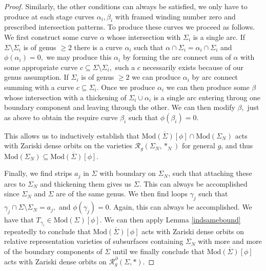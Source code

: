 \documentclass[10pt,a4paper]{amsart}
\newcommand{\Mod}{\textrm{Mod}}
\newcommand{\Rc}{\mathcal{R}}
\begin{document}
\begin{proof}
 Similarly, the other conditions can always be satisfied, we only have to produce at each stage curves $\alpha_i, \beta_i$ with framed winding number zero and prescribed intersection patterns. To produce these curves we proceed as follows. We first construct some curve $\alpha$ whose intersection with $\Sigma_i$ is a single arc. If $\Sigma \setminus \Sigma_i$ is of genus $\ge 2$ there is a curve $\alpha_i$ such that $\alpha \cap \Sigma_i  =\alpha_i \cap \Sigma_i$ and $\phi (\alpha_i) =0,$ we may produce this $\alpha_i$ by forming the arc connect sum of $\alpha$ with some appropriate curve $c \subseteq \Sigma \setminus \Sigma_i,$ such a $c$ necessarily exists because of our genus assumption. If $\Sigma_i$ is of genus $\ge 2$ we can produce $\alpha_i$ by arc connect summing with a curve $c \subseteq \Sigma_i.$ Once we produce $\alpha_i$ we can then produce  some $\beta$ whose intersection with a thickening of $\Sigma_i \cup \alpha_i$ is a single arc entering throug one boundary component and leaving through the other. We can then modify $\beta,$ just as above to obtain the require curve $\beta_i$ such that $\phi(\beta_i)=0.$
 
 
 
 This allows us to inductively establish that $\overline{\Mod(\Sigma)[\phi]} \cap \Mod(\Sigma_N)$ acts with Zariski dense orbits on the varieties $\Rc_g(\Sigma_N, *_N)$ for general $g$, and thus $\Mod(\Sigma_N) \subseteq \overline{\Mod(\Sigma)[\phi]}.$

 Finally, we find strips $a_j$ in $\Sigma$ with boundary on $\Sigma_N$, such that attaching these arcs to $\Sigma_N$ and thickening them gives us $\Sigma$. This can always be accomplished since $\Sigma_N$ and $\Sigma$ are of the same genus. We then find loops $\gamma_j$ such that $\gamma_j \cap \Sigma \setminus \Sigma_N  = a_j,$ and $\phi(\gamma_j ) =0.$ Again, this can always be accomplished. We have that $T_{\gamma_i} \in \Mod(\Sigma)[\phi].$ We can then apply Lemma \ref{indsamebound} repeatedly to conclude that $\overline{\Mod(\Sigma)[\phi]}$ acts with Zariski dense  orbits on relative representation varieties of subsurfaces containing $\Sigma_N$ with more and more  of the boundary components  of $\Sigma$ until we finally conclude that $\overline{\Mod(\Sigma) [\phi]}$ acts with Zariski dense orbits on $\Rc^{\partial}_g(\Sigma, *).$
 

 
\end{proof}
\end{document}

